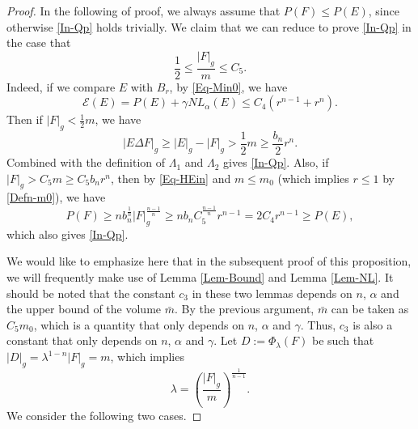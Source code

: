 \documentclass[11pt,reqno]{amsart}
\theoremstyle{definition}
\theoremstyle{remark}
\numberwithin{equation}{section}
\renewcommand{\(}{\left(}
\renewcommand{\)}{\right)}
\renewcommand{\-}{\overline}
\begin{document}
\begin{proof}
	In the following of proof, we always assume that $P(F)\leq P(E)$, since otherwise \eqref{In-Qp} holds trivially. We claim that we can reduce to prove \eqref{In-Qp} in the case that 
	\begin{equation}\label{In-twos}
		\frac{1}{2}\leq\frac{|F|_g}{m}\leq C_5.
	\end{equation}
	Indeed, if we compare $E$ with $B_r$, by \eqref{Eq-Min0}, we have
	\begin{equation}\label{Qp1}
		\mathcal{E}(E)=P(E)+\gamma NL_{\alpha}(E)\leq C_4(r^{n-1}+r^n).
	\end{equation}
	Then if $|F|_g<\frac{1}{2}m$, we have
	\begin{equation*}
		|E\Delta F|_g\geq |E|_g-|F|_g>\frac{1}{2}m\geq\frac{b_n}{2} r^n.
	\end{equation*}
	Combined with the definition of $\Lambda_1$ and $\Lambda_2$ gives \eqref{In-Qp}. Also, if $|F|_g>C_5 m\geq C_5 b_n r^n$, then by \eqref{Eq-HEin} and $m\leq m_0$ (which implies $r\leq 1$ by \eqref{Defn-m0}), we have
	\begin{equation*}
		P(F)\geq nb_n^{\frac{1}{n}}|F|_g^{\frac{n-1}{n}}\geq nb_n C_5^{\frac{n-1}{n}}r^{n-1}=2C_4 r^{n-1}\geq P(E),
	\end{equation*}
	which also gives \eqref{In-Qp}. 
    
    We would like to emphasize here that in the subsequent proof of this proposition, we will frequently make use of Lemma \ref{Lem-Bound} and Lemma \ref{Lem-NL}. It should be noted that the constant $c_3$ in these two lemmas depends on $n$, $\alpha$ and the upper bound of the volume $\bar{m}$. By the previous argument, $\bar{m}$ can be taken as $C_5 m_0$, which is a quantity that only depends on $n$, $\alpha$ and $\gamma$. Thus, $c_3$ is also a constant that only depends on $n$, $\alpha$ and $\gamma$. Let $D:=\Phi_{\lambda}(F)$ be such that $|D|_g=\lambda^{1-n}|F|_g=m$, which implies
	\begin{equation*}
		\lambda=\left(\frac{|F|_g}{m}\right)^{\frac{1}{n-1}}.
	\end{equation*}
We consider the following two cases.


\end{proof}
\end{document}
